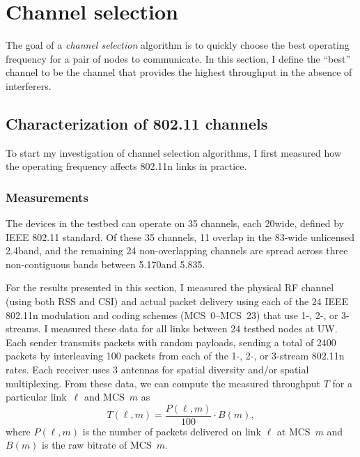 \section{Channel selection}\label{sec:esnr_chansel}
The goal of a \emph{channel selection} algorithm is to quickly choose the best operating frequency for a pair of nodes to communicate. In this section, I define the ``best'' channel to be the channel that provides the highest throughput in the absence of interferers.

\subsection{Characterization of 802.11 channels}
To start my investigation of channel selection algorithms, I first measured how the operating frequency affects 802.11n links in practice.

\subsubsection{Measurements}
\label{sec:chan_sel_data}
The  devices in the testbed can operate on 35 channels, each 20\MHz wide, defined by IEEE 802.11 standard. Of these 35 channels, 11 overlap in the 83-\MHz wide unlicensed 2.4\GHz band, and the remaining 24 non-overlapping channels are spread across three non-contiguous bands between 5.170\GHz and 5.835\GHz.

For the results presented in this section, I measured the physical RF channel (using both RSS and CSI) and actual packet delivery using each of the 24 IEEE 802.11n modulation and coding schemes (MCS~0--MCS~23) that use  1-, 2-, or 3-streams. I measured these data for all links between 24 testbed nodes at UW\@. Each sender transmits packets with random payloads, sending a total of 2400 packets by interleaving 100 packets from each of the 1-, 2-, or 3-stream 802.11n rates. Each receiver uses 3 antennas for spatial diversity and/or spatial multiplexing. From these data, we can compute the measured throughput $T$ for a particular link~$\ell$ and MCS~$m$ as
\begin{equation}
	\label{eq:prr_throughput}
	T(\ell,m) = \frac{P(\ell,m)}{100} \cdot B(m),
\end{equation}
where $P(\ell,m)$ is the number of packets delivered on link $\ell$ at MCS~$m$ and $B(m)$ is the raw bitrate of MCS~$m$.

